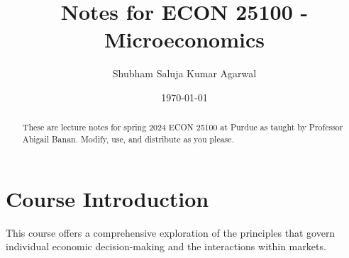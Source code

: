 \documentclass[nobib]{tufte-handout}
\title{Notes for ECON 25100 - Microeconomics}
\author[Shubham Saluja Kumar Agarwal]{Shubham Saluja Kumar Agarwal}
\date{\today}  %
\begin{document}
\maketitle

\begin{abstract}
    These are lecture notes for spring 2024 ECON 25100 at Purdue as taught by Professor Abigail Banan. Modify, use, and distribute as you please.
\end{abstract}

\tableofcontents

\section{Course Introduction}
This course offers a comprehensive exploration of the principles that govern
individual economic decision-making and the interactions within markets.

\pagebreak
\end{document}

